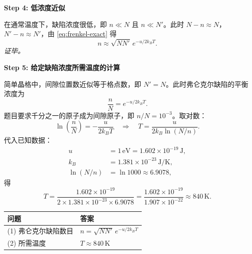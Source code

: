 \begin{derivationbox}[标准解题过程]
\textbf{Step 4: 低浓度近似}

在通常温度下，缺陷浓度很低，即 $n\ll N$ 且 $n\ll N'$。此时 $N-n\approx N$，$N'-n\approx N'$，由 \eqref{eq:frenkel-exact} 得
\begin{equation}
\boxed{n \approx \sqrt{NN'}\, e^{-u/2k_{\!B}T}.}
\label{eq:frenkel-approx}
\end{equation}
\textit{证毕。}

\textbf{Step 5: 给定缺陷浓度所需温度的计算}

简单晶格中，间隙位置数近似等于格点数，即 $N'=N$。此时弗仑克尔缺陷的平衡浓度为
\begin{equation}
\frac{n}{N} = e^{-u/2k_{\!B}T}.
\end{equation}
题目要求千分之一的原子成为间隙原子，即 $n/N = 10^{-3}$。取对数：
\begin{equation}
\ln\!\left(\frac{n}{N}\right) = -\frac{u}{2k_{\!B}T}
\quad\Longrightarrow\quad
T = \frac{u}{2k_{\!B}\ln(N/n)}.
\end{equation}
代入已知数据：
\begin{align}
u &= 1\,\mathrm{eV} = 1.602\times 10^{-19}\,\mathrm{J}, \\
k_{\!B} &= 1.381\times 10^{-23}\,\mathrm{J/K}, \\
\ln(N/n) &= \ln 1000 \approx 6.9078,
\end{align}
得
\begin{equation}
T = \frac{1.602\times 10^{-19}}{2\times 1.381\times 10^{-23}\times 6.9078}
= \frac{1.602\times 10^{-19}}{1.907\times 10^{-22}}
\approx \boxed{840\,\mathrm{K}}.
\end{equation}
\end{derivationbox}

\begin{formulabox}[答案汇总]
\begin{center}
\begin{tabular}{ll}
\toprule
\textbf{问题} & \textbf{答案} \\
\midrule
(1) 弗仑克尔缺陷数目 & $n = \sqrt{NN'}\, e^{-u/2k_{\!B}T}$ \\
(2) 所需温度 & $T \approx 840\,\mathrm{K}$ \\
\bottomrule
\end{tabular}
\end{center}
\end{formulabox}

